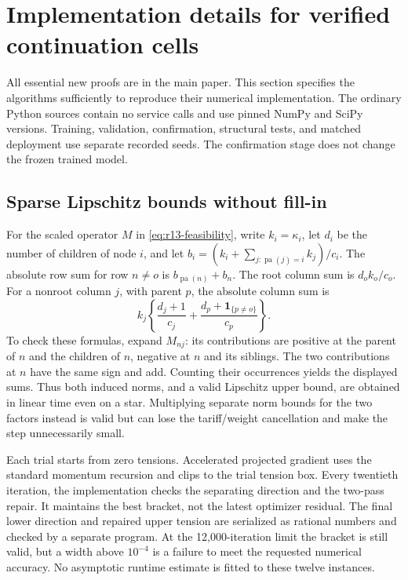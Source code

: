 \section{Implementation details for verified continuation cells}\label{ec:r13-implementation}
All essential new proofs are in the main paper. This section specifies the algorithms sufficiently to reproduce their numerical implementation. The ordinary Python sources contain no service calls and use pinned NumPy and SciPy versions. Training, validation, confirmation, structural tests, and matched deployment use separate recorded seeds. The confirmation stage does not change the frozen trained model.

\subsection{Sparse Lipschitz bounds without fill-in}
For the scaled operator $M$ in \eqref{eq:r13-feasibility}, write $k_i=\kappa_i$, let $d_i$ be the number of children of node $i$, and let $b_i=(k_i+\sum_{j:\operatorname{pa}(j)=i}k_j)/c_i$. The absolute row sum for row $n\ne o$ is $b_{\operatorname{pa}(n)}+b_n$. The root column sum is $d_ok_o/c_o$. For a nonroot column $j$, with parent $p$, the absolute column sum is
\[
 k_j\left\{\frac{d_j+1}{c_j}+\frac{d_p+\mathbf1_{\{p\ne o\}}}{c_p}\right\}.
\]
To check these formulas, expand $M_{nj}$: its contributions are positive at the parent of $n$ and the children of $n$, negative at $n$ and its siblings. The two contributions at $n$ have the same sign and add. Counting their occurrences yields the displayed sums. Thus both induced norms, and a valid Lipschitz upper bound, are obtained in linear time even on a star. Multiplying separate norm bounds for the two factors instead is valid but can lose the tariff/weight cancellation and make the step unnecessarily small.

Each trial starts from zero tensions. Accelerated projected gradient uses the standard momentum recursion and clips to the trial tension box. Every twentieth iteration, the implementation checks the separating direction and the two-pass repair. It maintains the best bracket, not the latest optimizer residual. The final lower direction and repaired upper tension are serialized as rational numbers and checked by a separate program. At the 12,000-iteration limit the bracket is still valid, but a width above $10^{-4}$ is a failure to meet the requested numerical accuracy. No asymptotic runtime estimate is fitted to these twelve instances.

